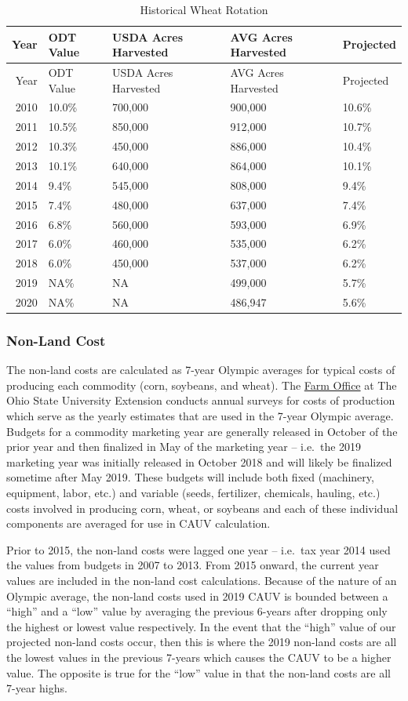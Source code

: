 \documentclass[]{article}
\begin{document}
\begin{longtable}[]{@{}rllll@{}}
\caption{Historical Wheat Rotation}\tabularnewline
\toprule
Year & ODT Value & USDA Acres Harvested & AVG Acres Harvested &
Projected\tabularnewline
\midrule
\endfirsthead
\toprule
Year & ODT Value & USDA Acres Harvested & AVG Acres Harvested &
Projected\tabularnewline
\midrule
\endhead
2010 & 10.0\% & 700,000 & 900,000 & 10.6\%\tabularnewline
2011 & 10.5\% & 850,000 & 912,000 & 10.7\%\tabularnewline
2012 & 10.3\% & 450,000 & 886,000 & 10.4\%\tabularnewline
2013 & 10.1\% & 640,000 & 864,000 & 10.1\%\tabularnewline
2014 & 9.4\% & 545,000 & 808,000 & 9.4\%\tabularnewline
2015 & 7.4\% & 480,000 & 637,000 & 7.4\%\tabularnewline
2016 & 6.8\% & 560,000 & 593,000 & 6.9\%\tabularnewline
2017 & 6.0\% & 460,000 & 535,000 & 6.2\%\tabularnewline
2018 & 6.0\% & 450,000 & 537,000 & 6.2\%\tabularnewline
2019 & NA\% & NA & 499,000 & 5.7\%\tabularnewline
2020 & NA\% & NA & 486,947 & 5.6\%\tabularnewline
\bottomrule
\end{longtable}

\hypertarget{non-land-cost}{%
\subsubsection{Non-Land Cost}\label{non-land-cost}}

The non-land costs are calculated as 7-year Olympic averages for typical
costs of producing each commodity (corn, soybeans, and wheat). The
\href{https://farmoffice.osu.edu/farm-management-tools/farm-budgets}{Farm
Office} at The Ohio State University Extension conducts annual surveys
for costs of production which serve as the yearly estimates that are
used in the 7-year Olympic average. Budgets for a commodity marketing
year are generally released in October of the prior year and then
finalized in May of the marketing year -- i.e.~the 2019 marketing year
was initially released in October 2018 and will likely be finalized
sometime after May 2019. These budgets will include both fixed
(machinery, equipment, labor, etc.) and variable (seeds, fertilizer,
chemicals, hauling, etc.) costs involved in producing corn, wheat, or
soybeans and each of these individual components are averaged for use in
CAUV calculation.

Prior to 2015, the non-land costs were lagged one year -- i.e.~tax year
2014 used the values from budgets in 2007 to 2013. From 2015 onward, the
current year values are included in the non-land cost calculations.
Because of the nature of an Olympic average, the non-land costs used in
2019 CAUV is bounded between a ``high'' and a ``low'' value by averaging
the previous 6-years after dropping only the highest or lowest value
respectively. In the event that the ``high'' value of our projected
non-land costs occur, then this is where the 2019 non-land costs are all
the lowest values in the previous 7-years which causes the CAUV to be a
higher value. The opposite is true for the ``low'' value in that the
non-land costs are all 7-year highs.
\end{document}
